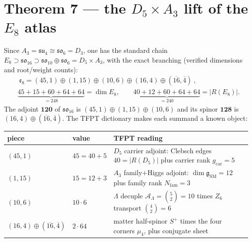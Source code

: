 \documentclass[11pt,a4paper]{article}
\newcommand{\gcar}{g_{\mathrm{car}}}
\newcommand{\Nfam}{N_{\mathrm{fam}}}
\newcommand{\AL}{\mathcal A_\Lambda}
\newcommand{\dimg}{\dim\mathfrak g_{\mathrm{SM}}}
\theoremstyle{definition}
\begin{document}
\section*{Theorem 7 --- the $D_5\times A_3$ lift of the $E_8$ atlas}
Since $A_3=\mathfrak{su}_4\cong\mathfrak{so}_6=D_3$, one has the standard chain
$E_8\supset \mathfrak{so}_{16}\supset \mathfrak{so}_{10}\oplus\mathfrak{so}_6=D_5\times A_3$, with the
exact branching (verified dimensions and root/weight counts):
\begin{equation}
\begin{aligned}
  &\boxed{\ \mathfrak e_8=(45,1)\oplus(1,15)\oplus(10,6)\oplus(16,4)\oplus(\overline{16},\overline4)\ },\\
  &\underbrace{45{+}15{+}60{+}64{+}64}_{=248}=\dim E_8,\qquad
  \underbrace{40{+}12{+}60{+}64{+}64}_{=240}=|R(E_8)| .
\end{aligned}
\end{equation}
The adjoint $\mathbf{120}$ of $\mathfrak{so}_{16}$ is $(45,1)\oplus(1,15)\oplus(10,6)$ and its spinor
$\mathbf{128}$ is $(16,4)\oplus(\overline{16},\overline4)$. The TFPT dictionary makes each summand a
known object:
\begin{center}\small
\begin{tabularx}{\linewidth}{@{}llY@{}}
\toprule
piece & value & TFPT reading \\
\midrule
$(45,1)$ & $45=40+5$ & $D_5$ carrier adjoint: Clebsch edges $40=|R(D_5)|$ plus carrier rank $\gcar=5$ \\
$(1,15)$ & $15=12+3$ & $A_3$ family$+$Higgs adjoint: $\dimg=12$ plus family rank $\Nfam=3$ \\
$(10,6)$ & $10\cdot6$ & $\Lambda$ decuple $\AL=\binom52=10$ times $Z_6$ transport $\binom42=6$ \\
$(16,4)\oplus(\overline{16},\overline4)$ & $2\cdot64$ & matter half-spinor $S^+$ times the four corners $\mu_4$, plus conjugate sheet \\
\bottomrule
\end{tabularx}
\end{center}
\end{document}
